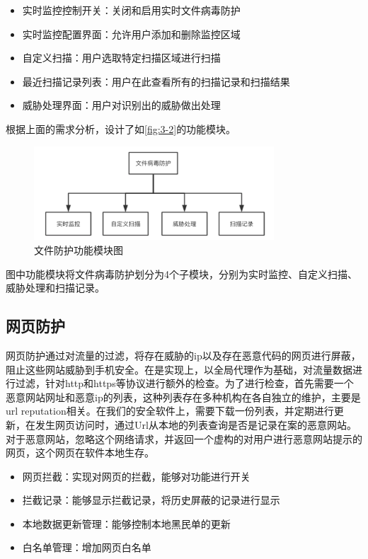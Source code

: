 \documentclass[format=final, language=chinese, degree=fyp]{hustthesis}
\begin{document}
\begin{itemize}
    \item 实时监控控制开关：关闭和启用实时文件病毒防护
    \item 实时监控配置界面：允许用户添加和删除监控区域
    \item 自定义扫描：用户选取特定扫描区域进行扫描
    \item 最近扫描记录列表：用户在此查看所有的扫描记录和扫描结果
    \item 威胁处理界面：用户对识别出的威胁做出处理
\end{itemize}

根据上面的需求分析，设计了如\autoref{fig:3-2}的功能模块。
\begin{figure}[!h]
	\centering
	\includegraphics[width=0.8\textwidth]{function_2.png}
	\caption{文件防护功能模块图}\label{fig:3-2}
\end{figure}

图中功能模块将文件病毒防护划分为4个子模块，分别为实时监控、自定义扫描、威胁处理和扫描记录。


\FloatBarrier
\subsection{网页防护}

网页防护通过对流量的过滤，将存在威胁的ip以及存在恶意代码的网页进行屏蔽，阻止这些网站威胁到手机安全。在是实现上，以全局代理作为基础，对流量数据进行过滤，针对http和https等协议进行额外的检查。为了进行检查，首先需要一个恶意网站网址和恶意ip的列表，这种列表存在多种机构在各自独立的维护，主要是url reputation相关。在我们的安全软件上，需要下载一份列表，并定期进行更新，在发生网页访问时，通过Url从本地的列表查询是否是记录在案的恶意网站。对于恶意网站，忽略这个网络请求，并返回一个虚构的对用户进行恶意网站提示的网页，这个网页在软件本地生存。

\begin{itemize}
    \item 网页拦截：实现对网页的拦截，能够对功能进行开关
    \item 拦截记录：能够显示拦截记录，将历史屏蔽的记录进行显示
    \item 本地数据更新管理：能够控制本地黑民单的更新
    \item 白名单管理：增加网页白名单
\end{itemize}
\end{document}

